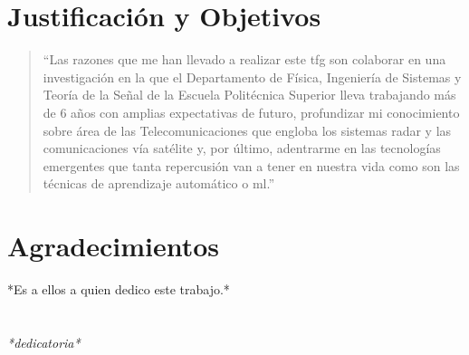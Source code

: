 
\chapter*{Justificación y Objetivos}
\thispagestyle{empty}
\begin{quote}
``Las razones que me han llevado a realizar este \gls{tfg} son colaborar en una investigación en la que el Departamento de Física, Ingeniería de Sistemas y Teoría de la Señal de la Escuela Politécnica Superior lleva trabajando más de 6 años con amplias expectativas de futuro, profundizar mi conocimiento sobre área de las Telecomunicaciones que engloba los sistemas radar y las comunicaciones vía satélite y, por último, adentrarme en las tecnologías emergentes que tanta repercusión van a tener en nuestra vida como son las técnicas de aprendizaje automático o \gls{ml}.''
\end{quote}


\cleardoublepage %
\chapter*{Agradecimientos}

\thispagestyle{empty}
\vspace{1cm}


*Es a ellos a quien dedico este trabajo.*

\cleardoublepage %
\chapter*{}
\setlength{\leftmargin}{0.5\textwidth}
\setlength{\parsep}{0cm}
\addtolength{\topsep}{0.5cm}
\begin{flushright}
\small\em{
*dedicatoria*\\
 
}
\end{flushright}


\cleardoublepage %
